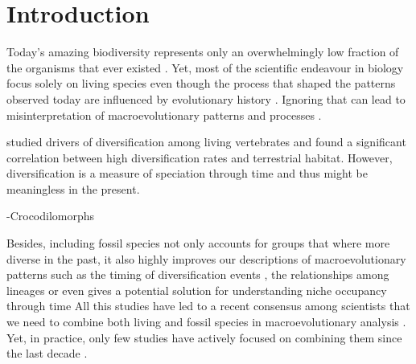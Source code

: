 \chapter{Introduction}
\label{chap:introduction}



%
% 


Today's amazing biodiversity represents only an overwhelmingly low fraction of the organisms that ever existed \citep{novacek1992ext,raup1993extinction}.
Yet, most of the scientific endeavour in biology focus solely on living species even though the process that shaped the patterns observed today are influenced by evolutionary history \citep{fritzdiversity2013}.
Ignoring that can lead to misinterpretation of macroevolutionary patterns and processes \citep{benton2015}.


\cite{Wiens2015} studied drivers of diversification among living vertebrates and found a significant correlation between high diversification rates and terrestrial habitat.
However, diversification is a measure of speciation through time and thus might be meaningless in the present.


-Crocodilomorphs


Besides, including fossil species not only accounts for groups that where more diverse in the past, it also highly improves our descriptions of macroevolutionary patterns such as the timing of diversification events \citep[e.g. significantly reducing node age confidence intervals;][]{ronquista2012}, the relationships among lineages \citep[e.g. solving some controversial fossil placement;][]{Dembo2015} or even gives a potential solution for understanding niche occupancy through time \citep[e.g.][]{pearmanniche2008}
All this studies have led to a recent consensus among scientists that we need to combine both living and fossil species in macroevolutionary analysis \citep{jacksonwhat2006,quentaldiversity2010,dietlconservation2011,slaterunifying2013,fritzdiversity2013,benton2015}.
Yet, in practice, only few studies have actively focused on combining them since the last decade \citep[e.g.][]{ronquista2012,slaterphylogenetic2013,Wood01032013,beckancient2014,Arcila2015131,Dembo2015}. %


